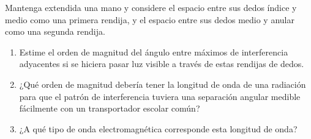 \item Mantenga extendida una mano y considere el espacio entre sus dedos índice y medio como una primera rendija, y el espacio entre sus dedos medio y anular como una segunda rendija.
\begin{enumerate}
    \item Estime el orden de magnitud del ángulo entre máximos de interferencia adyacentes si se hiciera pasar luz visible a través de estas rendijas de dedos.
    \item ¿Qué orden de magnitud debería tener la longitud de onda de una radiación para que el patrón de interferencia tuviera una separación angular medible fácilmente con un transportador escolar común?
    \item ¿A qué tipo de onda electromagnética corresponde esta longitud de onda?
\end{enumerate}